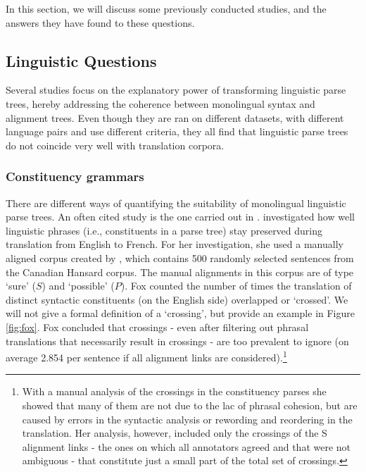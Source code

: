 \documentclass{report}
\begin{document}
In this section, we will discuss some previously conducted studies, and the answers they have found to these questions.

\subsection{Linguistic Questions}

Several studies focus on the explanatory power of transforming linguistic parse trees, hereby addressing the coherence between monolingual syntax and alignment trees. Even though they are ran on different datasets, with different language pairs and use different criteria, they all find that linguistic parse trees do not coincide very well with translation corpora.

\subsubsection{Constituency grammars}

There are different ways of quantifying the suitability of monolingual linguistic parse trees. An often cited study is the one carried out in \cite{fox2002phrasal}. \citeauthor{fox2002phrasal} investigated how well linguistic phrases (i.e., constituents in a parse tree) stay preserved during translation from English to French. For her investigation, she used a manually aligned corpus created by \cite{och2000improved}, which contains 500 randomly selected sentences from the Canadian Hansard corpus. The manual alignments in this corpus are of type `sure' ($S$) and `possible' ($P$). Fox counted the number of times the translation of distinct syntactic constituents (on the English side) overlapped or `crossed'. We will not give a formal definition of a `crossing', but provide an example in Figure \ref{fig:fox}. Fox concluded that crossings - even after filtering out phrasal translations that necessarily result in crossings - are too prevalent to ignore (on average 2.854 per sentence if all alignment links are considered).\footnote{With a manual analysis of the crossings in the constituency parses she showed that many of them are not due to the lac of phrasal cohesion, but are caused by errors in the syntactic analysis or rewording and reordering in the translation. Her analysis, however, included only the crossings of the S alignment links - the ones on which all annotators agreed and that were not ambiguous - that constitute just a small part of the total set of crossings.}
\end{document}
